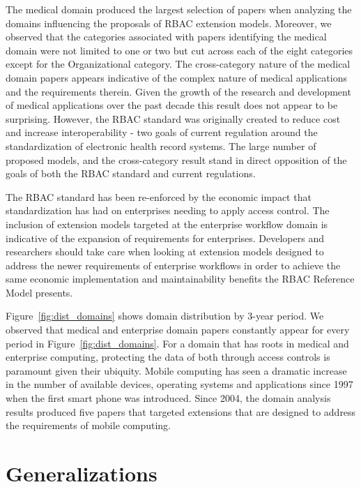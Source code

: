 The medical domain produced the largest selection of papers when analyzing the domains influencing the proposals of RBAC extension models.  
Moreover, we observed that the categories associated with papers identifying the medical domain were not limited to one or two but cut across
each of the eight categories except for the Organizational category. 
The cross-category nature of the medical domain papers appears indicative of the complex nature of medical applications and the requirements therein.
Given the growth of the research and development of medical applications over the past decade this result does not appear to be surprising. However,
the RBAC standard was originally created to reduce cost and increase interoperability - two goals of current regulation around the standardization
of electronic health record systems. The large number of proposed models, and the cross-category result stand in direct opposition of the goals
of both the RBAC standard and current regulations.

The RBAC standard has been re-enforced by the economic impact that standardization has had on enterprises needing to apply access control.  The
inclusion of extension models targeted at the enterprise workflow domain is indicative of the expansion of requirements for enterprises. Developers
and researchers should take care when looking at extension models designed to address the newer requirements of enterprise workflows in order to
achieve the same economic implementation and maintainability benefits the RBAC Reference Model presents.

Figure~\ref{fig:dist_domains} shows domain distribution by 3-year period.
We observed that medical and enterprise domain papers constantly appear for every period in Figure~\ref{fig:dist_domains}.
For a domain that has roots in medical and enterprise computing, protecting the data of both through access controls is paramount given their ubiquity. 
Mobile computing has seen a dramatic increase in the number of available devices, operating systems and applications since 1997 when the first smart phone was introduced. Since 2004, the domain analysis results produced five papers that targeted extensions that are designed to address the requirements of mobile computing. 



\section{Generalizations} \label{sec:generalizations}

